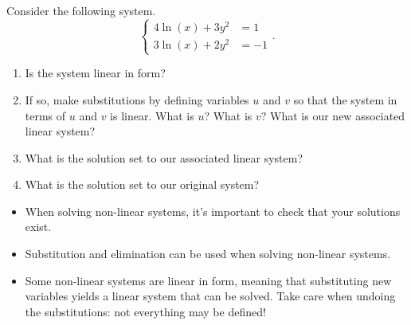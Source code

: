 \documentclass[nooutcomes]{ximera}
\begin{document}
\begin{exploration}
Consider the following system.
$$
\begin{cases}
4\ln(x) + 3y^2 & =  1 \\
3\ln(x) + 2y^2 & =  -1
\end{cases}.
$$
\begin{enumerate}
\item Is the system linear in form?
\item If so, make substitutions by defining variables $u$ and $v$ so that the system in terms of $u$ and $v$ is linear. What is $u$? What is $v$? What is our new associated linear system?
\item What is the solution set to our associated linear system?
\item What is the solution set to our original system?
\end{enumerate}
\end{exploration}

\begin{summary}
	\begin{itemize}
		\item When solving non-linear systems, it's important to check that your solutions exist.
		\item Substitution and elimination can be used when solving non-linear systems. 
		\item Some non-linear systems are linear in form, meaning that substituting new variables yields a linear system that can be solved. Take care when undoing the substitutions: not everything may be defined!
	\end{itemize}
\end{summary}
\end{document}
